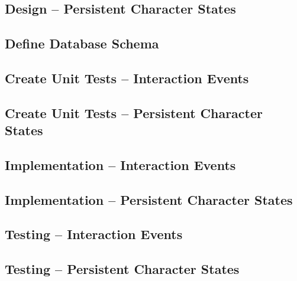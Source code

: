 \documentclass[11pt]{article}
\begin{document}
\subsection{Design -- Persistent Character States}
\label{sec:org9e83e7f}
\subsection{Define Database Schema}
\label{sec:org4aeea45}
\subsection{Create Unit Tests -- Interaction Events}
\label{sec:orgda8b048}
\subsection{Create Unit Tests -- Persistent Character States}
\label{sec:org17b9fe0}
\subsection{Implementation -- Interaction Events}
\label{sec:orgeb0e894}
\subsection{Implementation -- Persistent Character States}
\label{sec:orgb8f1c00}
\subsection{Testing -- Interaction Events}
\label{sec:org47c0bf3}
\subsection{Testing -- Persistent Character States}
\label{sec:org96b9086}
\end{document}
